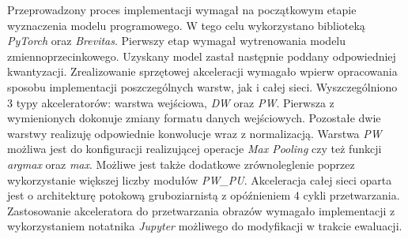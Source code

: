Przeprowadzony proces implementacji wymagał na początkowym etapie wyznaczenia modelu programowego. 
W tego celu wykorzystano biblioteką \emph{PyTorch} oraz \emph{Brevitas}.
Pierwszy etap wymagał wytrenowania modelu zmiennoprzecinkowego.
Uzyskany model zastał następnie poddany odpowiedniej kwantyzacji.
Zrealizowanie sprzętowej akceleracji wymagało wpierw opracowania sposobu implementacji poszczególnych warstw, jak i całej sieci.
Wyszczególniono 3 typy akceleratorów: warstwa wejściowa,  \emph{DW} oraz \emph{PW}.
Pierwsza z wymienionych dokonuje zmiany formatu danych wejściowych.
Pozostałe dwie warstwy realizuję odpowiednie konwolucje wraz z normalizacją.
Warstwa \emph{PW} możliwa jest do konfiguracji realizującej operacje \emph{Max Pooling} czy też funkcji \emph{argmax} oraz \emph{max}. 
Możliwe jest także dodatkowe zrównoleglenie poprzez wykorzystanie większej liczby modułów \emph{PW\_PU}. 
Akceleracja całej sieci oparta jest o architekturę potokową gruboziarnistą z opóźnieniem 4 cykli przetwarzania.
Zastosowanie akceleratora do przetwarzania obrazów wymagało implementacji z wykorzystaniem notatnika \emph{Jupyter} możliwego do modyfikacji w trakcie ewaluacji. 












